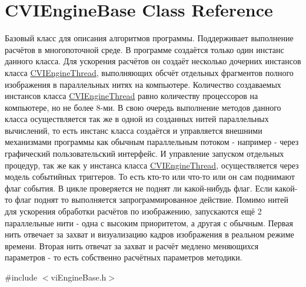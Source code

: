 \hypertarget{class_c_v_i_engine_base}{\section{C\+V\+I\+Engine\+Base Class Reference}
\label{class_c_v_i_engine_base}
}


Базовый класс для описания алгоритмов программы. Поддерживает выполнение расчётов в многопоточной среде. В программе создаётся только один инстанс данного класса. Для ускорения расчётов он создаёт несколько дочерних инстансов класса \hyperlink{class_c_v_i_engine_thread}{C\+V\+I\+Engine\+Thread}, выполняющих обсчёт отдельных фрагментов полного изображения в параллельных нитях на компьютере. Количество создаваемых инстансов класса \hyperlink{class_c_v_i_engine_thread}{C\+V\+I\+Engine\+Thread} равно количеству процессоров на компьютере, но не более 8-\/ми. В свою очередь выполнение методов данного класса осуществляется так же в одной из созданных нитей параллельных вычислений, то есть инстанс класса создаётся и управляется внешними механизмами программы как обычным параллельным потоком -\/ например -\/ через графический пользовательский интерфейс. И управление запуском отдельных процедур, так же как у инстанса класса \hyperlink{class_c_v_i_engine_thread}{C\+V\+I\+Engine\+Thread}, осуществляется через модель событийных триггеров. То есть кто-\/то или что-\/то или он сам поднимают флаг события. В цикле проверяется не поднят ли какой-\/нибудь флаг. Если какой-\/то флаг поднят то выполняется запрограммированное действие. Помимо нитей для ускорения обработки расчётов по изображению, запускаются ещё 2 параллельные нити -\/ одна с высоким приоритетом, а другая с обычным. Первая нить отвечает за захват и визуализацию кадров изображения в реальном режиме времени. Вторая нить отвечат за захват и расчёт медлено меняющихся параметров -\/ то есть собственно расчётных параметров методики.  




{\ttfamily \#include $<$vi\+Engine\+Base.\+h$>$}

